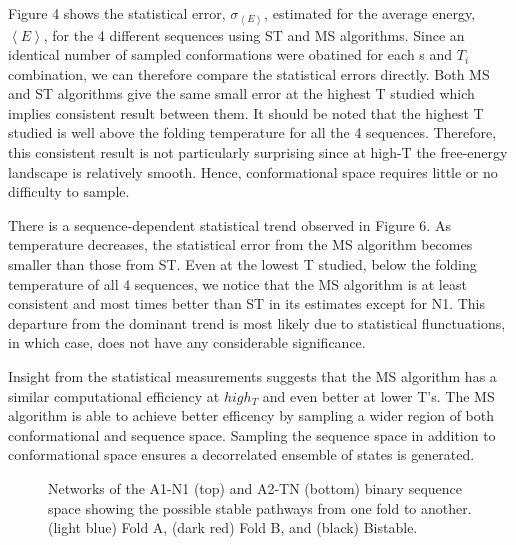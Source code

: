 \documentclass[
aip,
rsi,%
amsmath,amssymb,
reprint,%
]{revtex4-1}
\newcommand {\sigE}	{{\sigma_{\left < E \right >}}}
\begin{document}
Figure 4 shows the statistical error, $\sigE$, estimated for the average energy, $\left <E\right >$, for the 4 different sequences using ST and MS algorithms. Since an identical number of sampled conformations were obatined for each s and $T_i$ combination, we can therefore compare the statistical errors directly. Both MS and ST algorithms give the same small error at the highest T studied which implies consistent result between them. It should be noted that the highest T studied is well above the folding temperature for all the 4 sequences. Therefore, this consistent result is not particularly surprising since at high-T the free-energy landscape is relatively smooth. Hence, conformational space requires little or no difficulty to sample.

There is a sequence-dependent statistical trend observed in Figure 6. As temperature decreases, the statistical error from the MS algorithm becomes smaller than those from ST. Even at the lowest T studied, below the folding temperature of all 4 sequences, we notice that the MS algorithm is at least consistent and most times better than ST in its estimates except for N1. This departure from the dominant trend is most likely due to statistical flunctuations, in which case, does not have any considerable significance.

Insight from the statistical measurements suggests that the MS algorithm has a similar computational efficiency at $high_T$ and even better at lower T's. The MS algorithm is able to achieve  better efficency by sampling a wider region of both conformational and sequence space. Sampling the sequence space in addition to conformational space ensures a decorrelated ensemble of states is generated.

\begin{figure}
\caption{Networks of the A1-N1 (top) and A2-TN (bottom) binary sequence space showing the possible stable pathways from one fold to another. (light blue) Fold A, (dark red) Fold B, and (black) Bistable. }
\end{figure}
\end{document}

